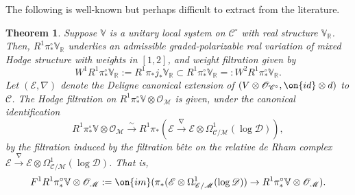 \documentclass[12 pt]{amsart}
\theoremstyle{plain}
\newtheorem{theorem}[subsubsection]{Theorem}
\theoremstyle{definition}
\theoremstyle{remark}
\numberwithin{equation}{section}
\begin{document}
The following is well-known but perhaps difficult to extract from the
literature.
\begin{theorem}\label{theorem:unitary-MHS}
	Suppose $\mathbb{V}$ is a unitary local system on $\mathscr{C}^\circ$
	with real structure $\mathbb{V}_\mathbb{R}$. Then,
	$R^1\pi^\circ_*\mathbb{V}_\mathbb{R}$ underlies an admissible
	graded-polarizable real variation of mixed Hodge structure with weights
	in $[1,2]$, and weight filtration given by 
$$W^1R^1\pi^\circ_*\mathbb{V}_\mathbb{R}:=R^1\pi_*j_*\mathbb{V}_\mathbb{R}\subset R^1\pi^\circ_*\mathbb{V}_\mathbb{R}=:W^2R^1\pi^\circ_*\mathbb{V}_\mathbb{R}.$$ 
Let $(\mathscr{E}, {\nabla})$ denote the Deligne canonical extension of $(V\otimes \mathscr{O}_{\mathscr{C}^\circ}, \on{id}\otimes d)$ to $\mathscr{C}$. The Hodge filtration on $R^1\pi^\circ_*\mathbb{V}\otimes \mathscr{O}_{\mathscr{M}}$ is given, under the canonical identification $$R^1\pi^\circ_*\mathbb{V}\otimes \mathscr{O}_{\mathscr{M}}\overset{\sim}{\longrightarrow} R^1\pi_*(\mathscr{E}\overset{{\nabla}}{\longrightarrow}\mathscr{E}\otimes \Omega^1_{\mathscr{C}/\mathscr{M}}(\log \mathscr{D})),$$ by the filtration induced by the \emph{filtration b\^{e}te} on the relative de Rham complex $\mathscr{E}\overset{{\nabla}}{\longrightarrow}\mathscr{E}\otimes \Omega^1_{\mathscr{C}/\mathscr{M}}(\log \mathscr{D})$. 
That is, $$F^1R^1\pi^\circ_*\mathbb{V}\otimes \mathscr{O}_\mathscr{M}:=\on{im}(\pi_*(\mathscr{E}\otimes \Omega^1_{\mathscr{C}/\mathscr{M}}(\log \mathscr{D}))\to R^1\pi^\circ_*\mathbb{V}\otimes \mathscr{O}_\mathscr{M}).$$
\end{theorem}
\end{document}
